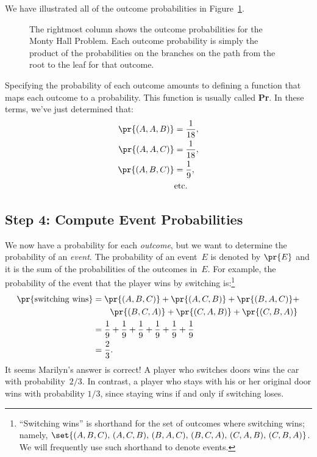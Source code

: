 We have illustrated all of the outcome probabilities in
Figure~\ref{fig:14A6}.

\begin{figure}[h]


\caption{The rightmost column shows the outcome probabilities for the
  Monty Hall Problem.  Each outcome probability is simply the product
  of the probabilities on the branches on the path from the root to
  the leaf for that outcome.}

\label{fig:14A6}
\end{figure}

Specifying the probability of each outcome amounts to defining a
function that maps each outcome to a probability.  This function is
usually called \textbf{Pr}.  In these terms, we've just determined
that:
%
\begin{align*}
\pr{(A, A, B)} & = \frac{1}{18}, \\
\pr{(A, A, C)} & = \frac{1}{18}, \\
\pr{(A, B, C)} & = \frac{1}{9}, \\
               & \text{etc.}
\end{align*}

\subsection{Step 4: Compute Event Probabilities}

We now have a probability for each \emph{outcome}, but we want to
determine the probability of an \emph{event}.  The probability of an
event~$E$ is denoted by $\pr{E}$ and it is the sum of the
probabilities of the outcomes in~$E$.  For example, the probability of
the event that the player wins by switching is:\footnote{``Switching
  wins'' is shorthand for the set of outcomes where switching wins;
  namely, $\set{ (A, B, C),\, (A, C, B),\, (B, A, C), \, (B, C, A), \,
    (C, A, B), \, (C, B, A) }$. We will frequently use such shorthand
  to denote events.}
%
\begin{align*}
\pr{\text{switching wins}}
    & = \pr{(A, B, C)} + \pr{(A, C, B)} + \pr{(B, A, C)} + \\
    & \qquad \pr{(B, C, A)} + \pr{(C, A, B)} + \pr{(C, B, A)} \\
    & = \frac{1}{9} + \frac{1}{9} + \frac{1}{9} +
        \frac{1}{9} + \frac{1}{9} + \frac{1}{9} \\
    & = \frac{2}{3}.
\end{align*}
%
It seems Marilyn's answer is correct!  A player who switches doors
wins the car with probability~$2/3$.  In contrast, a player who stays
with his or her original door wins with probability $1/3$, since
staying wins if and only if switching loses.

